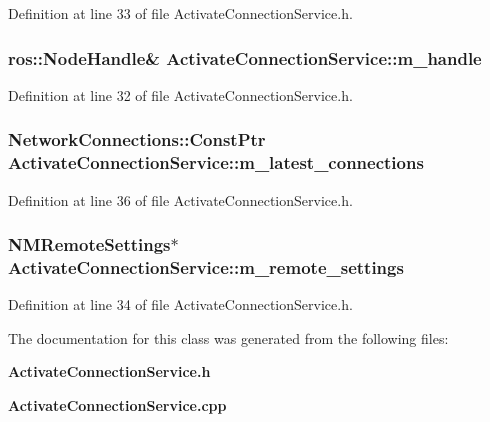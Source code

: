 \-Definition at line 33 of file \-Activate\-Connection\-Service.\-h.

\subsubsection[{m\-\_\-handle}]{\setlength{\rightskip}{0pt plus 5cm}ros\-::\-Node\-Handle\& {\bf \-Activate\-Connection\-Service\-::m\-\_\-handle}\hspace{0.3cm}{\ttfamily  [private]}}\label{classActivateConnectionService_a65a1507f91302366e6a15ed4e944d113}


\-Definition at line 32 of file \-Activate\-Connection\-Service.\-h.

\subsubsection[{m\-\_\-latest\-\_\-connections}]{\setlength{\rightskip}{0pt plus 5cm}\-Network\-Connections\-::\-Const\-Ptr {\bf \-Activate\-Connection\-Service\-::m\-\_\-latest\-\_\-connections}\hspace{0.3cm}{\ttfamily  [private]}}\label{classActivateConnectionService_abdbdad68c7231f6709718e0996f57392}


\-Definition at line 36 of file \-Activate\-Connection\-Service.\-h.

\subsubsection[{m\-\_\-remote\-\_\-settings}]{\setlength{\rightskip}{0pt plus 5cm}\-N\-M\-Remote\-Settings$\ast$ {\bf \-Activate\-Connection\-Service\-::m\-\_\-remote\-\_\-settings}\hspace{0.3cm}{\ttfamily  [private]}}\label{classActivateConnectionService_aa9a6f263a0a6deb10bc4bd624bec21c8}


\-Definition at line 34 of file \-Activate\-Connection\-Service.\-h.



\-The documentation for this class was generated from the following files\-:\begin{DoxyCompactItemize}
\item 
{\bf \-Activate\-Connection\-Service.\-h}\item 
{\bf \-Activate\-Connection\-Service.\-cpp}\end{DoxyCompactItemize}
